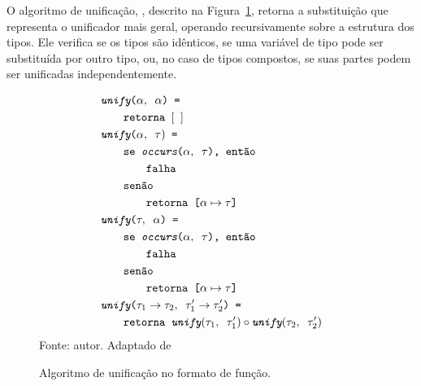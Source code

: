 O algoritmo de unificação, \Unify, descrito na Figura~\ref{algo:unify}, retorna a substituição que representa o unificador mais geral, operando recursivamente sobre a estrutura dos tipos.
Ele verifica se os tipos são idênticos, se uma variável de tipo pode ser substituída por outro tipo, ou, no caso de tipos compostos, se suas partes podem ser unificadas independentemente.

\begin{figure}[ht!]
  \caption{Algoritmo de unificação no formato de função.}
  \centering
  \begin{align*}
     & \texttt{\Unify($\alpha, \Whitespace \alpha$) = }                                                                     \\
     & \qquad{}\texttt{\Return \Whitespace $[\Whitespace]$}                                                                 \\
     & \texttt{\Unify($\alpha, \Whitespace \tau)$ = }                                                                       \\
     & \qquad{}\texttt{\If \Whitespace \Occurs($\alpha, \Whitespace \tau$), \Then}                                          \\
     & \qquad{}\qquad{}\texttt{\Fail}                                                                                       \\
     & \qquad{}\texttt{\Else}                                                                                               \\
     & \qquad{}\qquad{}\texttt{\Return \Whitespace [$\alpha\mapsto\tau$]}                                                   \\
     & \texttt{\Unify($\tau, \Whitespace \alpha$) = }                                                                       \\
     & \qquad{}\texttt{\If \Whitespace \Occurs($\alpha, \Whitespace \tau$), \Then}                                          \\
     & \qquad{}\qquad{}\texttt{\Fail}                                                                                       \\
     & \qquad{}\texttt{\Else}                                                                                               \\
     & \qquad{}\qquad{}\texttt{\Return \Whitespace [$\alpha\mapsto\tau$]}                                                   \\
     & \texttt{\Unify($\tau_1 \to \tau_2, \Whitespace \tau_1' \to \tau_2'$) = }                                             \\
     & \qquad{}\texttt{\Return \Whitespace $\Unify(\tau_1, \Whitespace \tau_1') \circ \Unify(\tau_2, \Whitespace \tau_2')$}
  \end{align*}
  \small{Fonte: autor. Adaptado de~\cite{ribeiro2016mechanized}}\label{algo:unify}
\end{figure}

